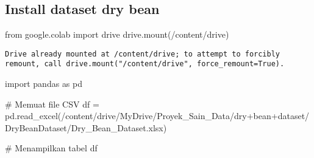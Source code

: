 \documentclass[
  letterpaper,
]{krantz}
\makeatletter
\newenvironment{Shaded}{\begin{snugshade}}{\end{snugshade}}
\newcommand{\CommentTok}[1]{\textcolor[rgb]{0.37,0.37,0.37}{#1}}
\newcommand{\ImportTok}[1]{\textcolor[rgb]{0.00,0.46,0.62}{#1}}
\newcommand{\NormalTok}[1]{\textcolor[rgb]{0.00,0.23,0.31}{#1}}
\newcommand{\OperatorTok}[1]{\textcolor[rgb]{0.37,0.37,0.37}{#1}}
\newcommand{\StringTok}[1]{\textcolor[rgb]{0.13,0.47,0.30}{#1}}
\newenvironment{kframe}{%
\medskip{}
\setlength{\fboxsep}{.8em}
 \def\at@end@of@kframe{}%
 \ifinner\ifhmode%
  \def\at@end@of@kframe{\end{minipage}}%
  \begin{minipage}{\columnwidth}%
 \fi\fi%
 \def\FrameCommand##1{\hskip\@totalleftmargin \hskip-\fboxsep
 \colorbox{shadecolor}{##1}\hskip-\fboxsep
     \hskip-\linewidth \hskip-\@totalleftmargin \hskip\columnwidth}%
 \MakeFramed {\advance\hsize-\width
   \@totalleftmargin\z@ \linewidth\hsize
   \@setminipage}}%
 {\par\unskip\endMakeFramed%
 \at@end@of@kframe}
\renewenvironment{Shaded}{\begin{kframe}}{\end{kframe}}
\makeatother
\begin{document}
\hypertarget{install-dataset-dry-bean}{%
\subsection{Install dataset dry bean}\label{install-dataset-dry-bean}}

\begin{Shaded}
\begin{Highlighting}[]
\ImportTok{from}\NormalTok{ google.colab }\ImportTok{import}\NormalTok{ drive}
\NormalTok{drive.mount(}\StringTok{\textquotesingle{}/content/drive\textquotesingle{}}\NormalTok{)}
\end{Highlighting}
\end{Shaded}

\begin{verbatim}
Drive already mounted at /content/drive; to attempt to forcibly remount, call drive.mount("/content/drive", force_remount=True).
\end{verbatim}

\begin{Shaded}
\begin{Highlighting}[]
\ImportTok{import}\NormalTok{ pandas }\ImportTok{as}\NormalTok{ pd}

\CommentTok{\# Memuat file CSV}
\NormalTok{df }\OperatorTok{=}\NormalTok{ pd.read\_excel(}\StringTok{\textquotesingle{}/content/drive/MyDrive/Proyek\_Sain\_Data/dry+bean+dataset/DryBeanDataset/Dry\_Bean\_Dataset.xlsx\textquotesingle{}}\NormalTok{)}

\CommentTok{\# Menampilkan tabel}
\NormalTok{df}
\end{Highlighting}
\end{Shaded}
\end{document}
